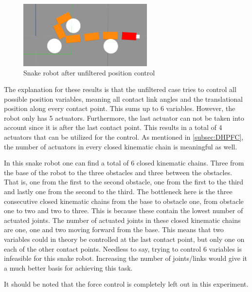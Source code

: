 \begin{figure}
    \centering
    \includegraphics[width=0.6\textwidth]{figures/experiments/single_pos/gazebo_single_pos_nofilter.png}
    \caption{Snake robot after unfiltered position control}
    \label{fig:singlepos-gazebo-nofilter}
\end{figure}

The explanation for these results is that the unfiltered case tries to control all possible position variables, meaning all contact link angles and the translational position along every contact point. This sums up to 6 variables. However, the robot only has 5 actuators. Furthermore, the last actuator can not be taken into account since it is after the last contact point. This results in a total of 4 actuators that can be utilized for the control. As mentioned in \ref{subsec:DHPFC}, the number of actuators in every closed kinematic chain is meaningful as well.

In this snake robot one can find a total of 6 closed kinematic chains. Three from the base of the robot to the three obstacles and three between the obstacles. That is, one from the first to the second obstacle, one from the first to the third and lastly one from the second to the third. The bottleneck here is the three consecutive closed kinematic chains from the base to obstacle one, from obstacle one to two and two to three. This is because these contain the lowest number of actuated joints. The number of actuated joints in these closed kinematic chains are one, one and two moving forward from the base. This means that two variables could in theory be controlled at the last contact point, but only one on each of the other contact points. Needless to say, trying to control 6 variables is infeasible for this snake robot. Increasing the number of joints/links would give it a much better basis for achieving this task.


It should be noted that the force control is completely left out in this experiment. 



